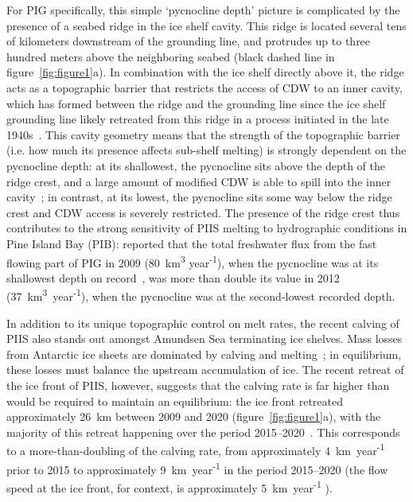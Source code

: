 \documentclass[draft]{agujournal2019}
\begin{document}
For PIG specifically, this simple `pycnocline depth' picture is complicated by the presence of a seabed ridge in the ice shelf cavity. This ridge is located several tens of kilometers downstream of the grounding line, and protrudes up to three hundred meters above the neighboring seabed (black dashed line in figure~\ref{fig:figure1}a). In combination with the ice shelf directly above it, the ridge acts as a topographic barrier that restricts the access of CDW to an inner cavity, which has formed between the ridge and the grounding line since the ice shelf grounding line likely retreated from this ridge in a process initiated in the late 1940s~\cite{Jenkins2010NatureGeo, DeRydt2014JGeophysResOceans, DeRydt2016JGeophysResEarthSurf, Smith2017Nature}. This cavity geometry means that the strength of the topographic barrier (i.e. how much its presence affects sub-shelf melting) is strongly dependent on the pycnocline depth: at its shallowest, the pycnocline sits above the depth of the ridge crest, and a large amount of modified CDW is able to spill into the inner cavity~\cite{Dutrieux2014Science}; in contrast, at its lowest, the pycnocline sits some way below the ridge crest and CDW access is severely restricted.  The presence of the ridge crest thus contributes to the strong sensitivity of PIIS melting to hydrographic conditions in Pine Island Bay (PIB):  reported that the total freshwater flux from the fast flowing part of PIG in 2009 (80~km\textsuperscript{3} year\textsuperscript{-1}), when the pycnocline was at its shallowest depth on record~\cite{Webber2017NatureComms}, was more than double its value in 2012 (37~km\textsuperscript{3}~year\textsuperscript{-1}), when the pycnocline was at the second-lowest recorded depth.

In addition to its unique topographic control on melt rates, the recent calving of PIIS also stands out amongst Amundsen Sea terminating ice shelves. Mass losses from Antarctic ice sheets are dominated by calving and melting~\cite{Rignot2013Science}; in equilibrium, these losses must balance the upstream accumulation of ice. The recent retreat of the ice front of PIIS, however, suggests that the calving rate is far higher than would be required to maintain an equilibrium: the ice front retreated approximately 26 km between 2009 and 2020 (figure~\ref{fig:figure1}a), with the majority of this retreat happening over the period 2015--2020~\cite{Lhermitte2020PNAS, Joughin2021ScienceAdv}. This corresponds to a more-than-doubling of the calving rate, from approximately 4~km~year\textsuperscript{-1} prior to 2015 to approximately 9~km~year\textsuperscript{-1} in the period 2015--2020 (the flow speed at the ice front, for context, is approximately 5~km~year\textsuperscript{-1} \cite{Joughin2021ScienceAdv}).
\end{document}
